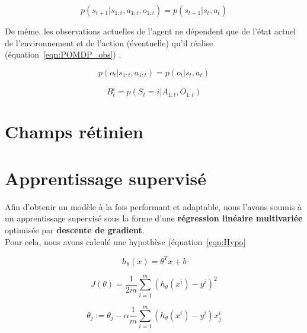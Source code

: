 \begin{equation}
p(s_{t+1}|s_{1:t},a_{1:t},o_{1:t}) = p(s_{t+1}|s_{t},a_{t})
\label{eqn:POMDP_sta}
\end{equation}

De même, les observations actuelles de l'agent ne dépendent que de l'état actuel de l'environnement et de l'action (éventuelle) qu'il réalise (équation~\ref{eqn:POMDP_obs}) \autocite{Butko2010}.

\begin{equation}
p(o_{t}|s_{1:t},a_{1:t}) = p(o_{t}|s_{t},a_{t})
\label{eqn:POMDP_obs}
\end{equation}

\begin{equation}
B_{t}^i = p(S_{t} = i|A_{1:t},O_{1:t})
\label{eqn:POMDP_bel}
\end{equation}



\section{Champs rétinien} %


\section{Apprentissage supervisé} %

Afin d'obtenir un modèle à la fois performant et adaptable, nous l'avons soumis à un apprentissage supervisé sous la forme d'une \textbf{régression linéaire multivariée} optimisée par \textbf{descente de gradient}.\\
Pour cela, nous avons calculé une hypothèse (équation~\ref{eqn:Hypo}

\begin{equation}
h_{\theta}(x) = \theta^{T}x + b
\label{eqn:Hypo}
\end{equation}

\begin{equation}
J(\theta) = \frac{1}{2m} \sum_{i=1}^m (h_\theta(x^i)-y^i)^2
\label{eqn:Cost}
\end{equation}

\begin{equation}
\theta_j := \theta_j - \alpha \frac{1}{m} \sum_{i=1}^m (h_\theta(x^i) - y^i)x_{j}^i
\label{eqn:Grad_desc}
\end{equation}